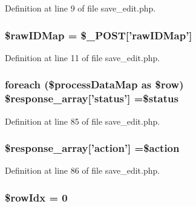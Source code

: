 Definition at line 9 of file save\-\_\-edit.\-php.

\hypertarget{save__edit_8php_a2c543a123b646cdf11c814983d4a13cf}{
\subsubsection[{\$raw\-I\-D\-Map}]{\setlength{\rightskip}{0pt plus 5cm}\$raw\-I\-D\-Map = \$\-\_\-\-P\-O\-S\-T\mbox{[}'raw\-I\-D\-Map'\mbox{]}}}\label{save__edit_8php_a2c543a123b646cdf11c814983d4a13cf}


Definition at line 11 of file save\-\_\-edit.\-php.

\hypertarget{save__edit_8php_a4ba95aec8cb028451e78a65b37d972d7}{
\subsubsection[{\$response\-\_\-array}]{\setlength{\rightskip}{0pt plus 5cm}foreach (\$process\-Data\-Map as \$row) \$response\-\_\-array\mbox{[}'status'\mbox{]} =\$status}}\label{save__edit_8php_a4ba95aec8cb028451e78a65b37d972d7}


Definition at line 85 of file save\-\_\-edit.\-php.

\hypertarget{save__edit_8php_ae768978a0cdc416c0d63d798c85c8784}{
\subsubsection[{\$response\-\_\-array}]{\setlength{\rightskip}{0pt plus 5cm}\$response\-\_\-array\mbox{[}'action'\mbox{]} =\$action}}\label{save__edit_8php_ae768978a0cdc416c0d63d798c85c8784}


Definition at line 86 of file save\-\_\-edit.\-php.

\hypertarget{save__edit_8php_a2457f3fab8183bd163626612df265a7e}{
\subsubsection[{\$row\-Idx}]{\setlength{\rightskip}{0pt plus 5cm}\$row\-Idx = 0}}\label{save__edit_8php_a2457f3fab8183bd163626612df265a7e}


